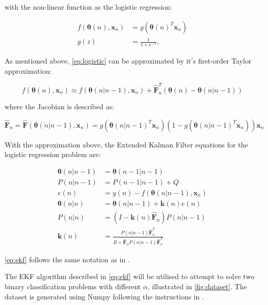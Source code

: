 \documentclass{article}
\begin{document}
with the non-linear function as the logistic regression:

\begin{equation}
    \begin{split}
        f(\pmb{\theta}(n), \pmb{x}_n) &= g(\pmb{\theta}(n)^T \pmb{x}_n)\\
        g(z) &= \frac{1}{1 + e^{-z}},
    \end{split}
    \label{eq:logistic}
\end{equation}

As mentioned above, \cref{eq:logistic} can be approximated by it's first-order Taylor approximation:

\begin{equation}
    f(\pmb{\theta}(n), \pmb{x}_n) \approx f(\pmb{\theta}(n|n-1), \pmb{x}_n) + \pmb{\hat{F}}_n^T (\pmb{\theta}(n) - \pmb{\theta}(n|n-1))
\end{equation}
    
where the Jacobian is described as:

\begin{equation}
     \pmb{\hat{F}}_n = \pmb{\hat{F}}(\pmb{\theta}(n|n-1), \pmb{x}_n) = g(\pmb{\theta}(n|n-1)^T \pmb{x}_n)(1 - g(\pmb{\theta}(n|n-1)^T \pmb{x}_n)) \pmb{x}_n
\end{equation}

With the approximation above, the Extended Kalman Filter equations for the logistic regression problem are:

\begin{equation}
    \begin{split}
        \pmb{\theta}(n|n-1) &= \pmb{\theta}(n-1|n-1)\\
        P(n|n-1) &= P(n-1|n-1) + Q\\
        e(n) &= y(n) - f(\pmb{\theta}(n|n-1), \pmb{x}_n)\\
        \pmb{\theta}(n|n) &= \pmb{\theta}(n|n-1) + \pmb{k}(n)e(n)\\
        P(n|n) &= (I - \pmb{k}(n) \pmb{\hat{F}}_n) P(n|n-1)\\
        \pmb{k}(n) &= \frac{P(n|n-1) \pmb{\hat{F}}_n^T}{R + \pmb{\hat{F}}_n P(n|n-1) \pmb{\hat{F}}_n^T}
    \end{split}
    \label{eq:ekf}
\end{equation}

\cref{eq:ekf} follows the same notation as in \cite{lab3}.

The EKF algorithm described in \cref{eq:ekf} will be utilised to attempt to solve two binary classification problems with different $\alpha$, illustrated in \cref{fig:dataset}. The dataset is generated using Numpy following the instructions in \cite{lab3}.
\end{document}
